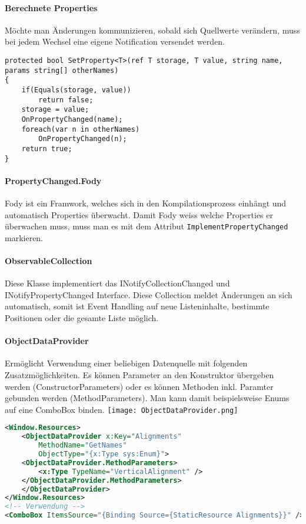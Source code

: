 \paragraph{Berechnete Properties} Möchte man Änderungen kommunizieren, sobald sich Quellwerte verändern, muss bei jedem Wechsel eine eigene Notification versendet werden. 
\begin{lstlisting}
protected bool SetProperty<T>(ref T storage, T value, string name, params string[] otherNames)
{
    if(Equals(storage, value))
        return false;
    storage = value;
    OnPropertyChanged(name);
    foreach(var n in otherNames)
        OnPropertyChanged(n);
    return true;
}
\end{lstlisting}
\paragraph{PropertyChanged.Fody} Fody ist ein Framwork, welches sich in den Kompilationsprozess einhängt und automatisch Properties überwacht. Damit Fody weiss welche Properties er überwachen muss, muss man es mit dem Attribut \verb+ImplementPropertyChanged+ markieren. 
\paragraph{ObservableCollection} Diese Klasse implementiert das INotifyCollectionChanged und INotifyPropertyChanged Interface. Diese Collection meldet Änderungen an sich automatisch, somit ist Event Handling auf neue Listeninhalte, bestimmte Positionen oder die gesamte Liste möglich.
\paragraph{ObjectDataProvider} Ermöglicht Verwendung einer beliebigen Datenquelle mit folgenden Zusatzmöglichkeiten. Es können Parameter an den Konstruktor übergeben werden (ConstructorParameters) oder es können Methoden inkl. Paramter gebunden werden (MethodParameters). Man kann damit beispielsweise Enums auf eine ComboBox binden.
\texttt{[image: ObjectDataProvider.png]}
\begin{lstlisting}[language=xml]
<Window.Resources>
    <ObjectDataProvider x:Key="Alignments"
        MethodName="GetNames"
        ObjectType="{x:Type sys:Enum}">
    <ObjectDataProvider.MethodParameters>
        <x:Type TypeName="VerticalAlignment" />
    </ObjectDataProvider.MethodParameters>
    </ObjectDataProvider>
</Window.Resources>
<!-- Verwendung -->
<ComboBox ItemsSource="{Binding Source={StaticResource Alignments}}" />
\end{lstlisting}
